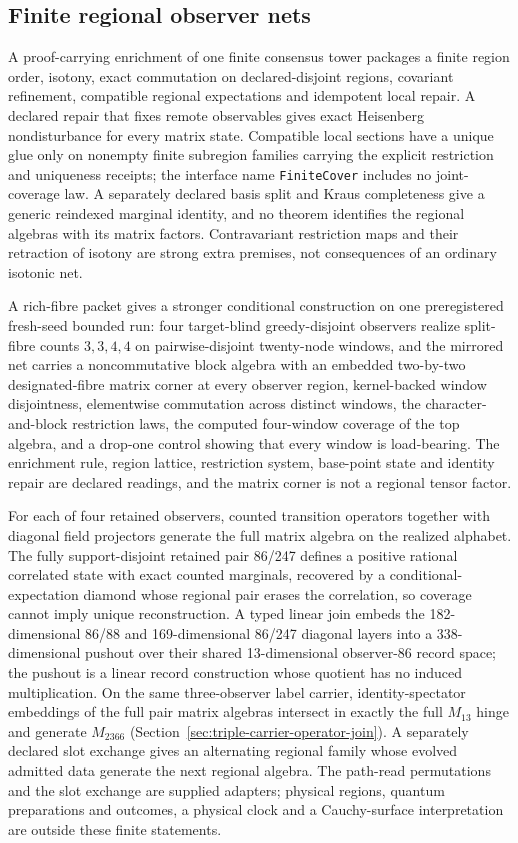 \documentclass[11pt]{article}
\newcounter{none}
\begin{document}
\subsection{Finite regional observer nets}
\label{sec:regional-net}

A proof-carrying enrichment of one finite consensus tower packages a finite
region order, isotony, exact commutation on declared-disjoint regions,
covariant refinement, compatible regional expectations and idempotent local
repair. A declared repair that fixes remote observables gives exact Heisenberg
nondisturbance for every matrix state. Compatible local sections have a unique
glue only on nonempty finite subregion families carrying the explicit
restriction and uniqueness receipts; the interface name \texttt{FiniteCover}
includes no joint-coverage law. A separately declared basis split and Kraus
completeness give a generic reindexed marginal identity, and no theorem
identifies the regional algebras with its matrix factors. Contravariant
restriction maps and their retraction of isotony are strong extra premises,
not consequences of an ordinary isotonic net.

{\raggedright
A rich-fibre packet gives a stronger conditional construction on one
preregistered fresh-seed bounded run: four target-blind greedy-disjoint
observers realize split-fibre counts \(3,3,4,4\) on pairwise-disjoint
twenty-node windows, and the mirrored net carries a noncommutative block
algebra with an embedded two-by-two designated-fibre matrix corner at every
observer region, kernel-backed window disjointness, elementwise commutation
across distinct windows, the character-and-block restriction laws, the
computed four-window coverage of the top algebra, and a drop-one control
showing that every window is load-bearing. The enrichment rule, region
lattice, restriction system, base-point state and identity repair are declared
readings, and the matrix corner is not a regional tensor factor.\par}


For each of four retained observers, counted transition operators together
with diagonal field projectors generate the full matrix algebra on the
realized alphabet. The fully support-disjoint retained pair 86/247 defines a
positive rational correlated state with exact counted marginals, recovered by
a conditional-expectation diamond whose regional pair erases the correlation,
so coverage cannot imply unique reconstruction. A typed linear join embeds the
182-dimensional 86/88 and 169-dimensional 86/247 diagonal layers into a
338-dimensional pushout over their shared 13-dimensional observer-86 record
space; the pushout is a linear record construction whose quotient has no
induced multiplication. On the same three-observer label carrier,
identity-spectator embeddings of the full pair matrix algebras intersect in
exactly the full \(M_{13}\) hinge and generate \(M_{2366}\)
(Section~\ref{sec:triple-carrier-operator-join}). A separately declared slot
exchange gives an alternating regional family whose evolved admitted data
generate the next regional algebra. The path-read permutations and the slot
exchange are supplied adapters; physical regions, quantum preparations and
outcomes, a physical clock and a Cauchy-surface interpretation are outside
these finite statements.
\end{document}
